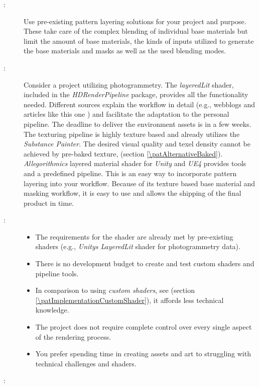 \begin{description}
	\item[\patIntent:]%
	Use pre-existing pattern layering solutions for your project and purpose. These take care of the complex blending of individual base materials but limit the amount of base materials, the kinds of inputs utilized to generate the base materials and masks as well as the used blending modes. 
	\item[\patMotivation:]%
	Consider a project utilizing photogrammetry. The \emph{layeredLit} shader, included in the \emph{HDRenderPipeline} package, provides all the functionality needed. Different sources explain the workflow in detail (e.g., webblogs and articles like this one \cite{unity2017photogrammetryLayered}) and facilitate the adaptation to the personal pipeline. The deadline to deliver the environment assets is in a few weeks. The texturing pipeline is highly texture based and already utilizes the \emph{Substance Painter}. The desired visual quality and texel density cannot be achieved by pre-baked texture, \emph{\patAlternativeBaked} (section \ref{\patAlternativeBaked}). \emph{Allegorithmics} layered material shader for \emph{Unity} and \emph{UE4} provides tools and a predefined pipeline. This is an easy way to incorporate pattern layering into your workflow. Because of its texture based base material and masking workflow, it is easy to use and allows the shipping of the final product in time. 
	\item[\patApplicability:]\hfill
	\begin{itemize}\mynobreakpar
		\item The requirements for the shader are already met by pre-existing shaders (e.g., \emph{Unitys LayeredLit} shader for photogrammetry data).
		\item There is no development budget to create and test custom shaders and pipeline tools.
		\item In comparison to using \emph{custom shaders}, see \emph{\patImplementationCustomShader} (section \ref{\patImplementationCustomShader}), it affords less technical knowledge.  
		\item The project does not require complete control over every single aspect of the rendering process.
		\item  You prefer spending time in creating assets and art to struggling with technical challenges and shaders. 
	\end{itemize} 
	\item[\patImplementation:]%

\end{description}
